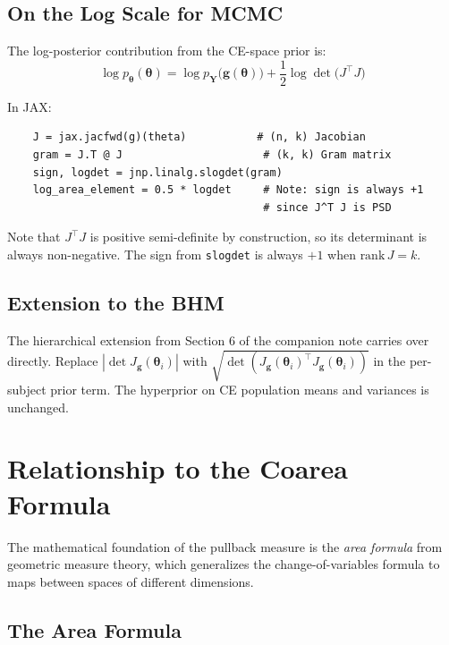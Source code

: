 \documentclass[11pt,a4paper]{article}
\theoremstyle{definition}
\newcommand{\btheta}{\boldsymbol{\theta}}
\begin{document}
\subsection{On the Log Scale for MCMC}

The log-posterior contribution from the CE-space prior is:
\begin{equation}
    \log p_{\btheta}(\btheta) = \log p_{\mathbf{Y}}\!\big(\mathbf{g}(\btheta)\big)
    + \frac{1}{2} \log \det\!\big(J^\top J\big)
\end{equation}

In JAX:
\begin{verbatim}
    J = jax.jacfwd(g)(theta)           # (n, k) Jacobian
    gram = J.T @ J                      # (k, k) Gram matrix
    sign, logdet = jnp.linalg.slogdet(gram)
    log_area_element = 0.5 * logdet     # Note: sign is always +1
                                        # since J^T J is PSD
\end{verbatim}

Note that $J^\top J$ is positive semi-definite by construction, so its
determinant is always non-negative. The sign from \texttt{slogdet} is always
$+1$ when $\text{rank}\, J = k$.

\subsection{Extension to the BHM}

The hierarchical extension from Section 6 of the companion note carries over
directly. Replace $|\!\det J_{\mathbf{g}}(\btheta_i)|$ with
$\sqrt{\det(J_{\mathbf{g}}(\btheta_i)^\top J_{\mathbf{g}}(\btheta_i))}$
in the per-subject prior term. The hyperprior on CE population means and
variances is unchanged.


\section{Relationship to the Coarea Formula}
\label{sec:coarea}

The mathematical foundation of the pullback measure is the \emph{area formula}
from geometric measure theory, which generalizes the change-of-variables
formula to maps between spaces of different dimensions.

\subsection{The Area Formula}
\end{document}
